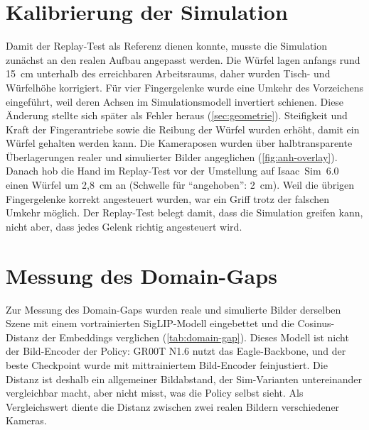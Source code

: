 \section{Kalibrierung der Simulation}
\label{sec:kalibrierung}

Damit der Replay-Test als Referenz dienen konnte, musste die Simulation
zunächst an den realen Aufbau angepasst werden. Die Würfel lagen anfangs rund
15~cm unterhalb des erreichbaren Arbeitsraums, daher wurden Tisch- und
Würfelhöhe korrigiert. Für vier Fingergelenke wurde eine Umkehr des
Vorzeichens eingeführt, weil deren Achsen im Simulationsmodell invertiert
schienen. Diese Änderung stellte sich später als Fehler heraus
(\cref{sec:geometrie}). Steifigkeit und Kraft der Fingerantriebe sowie die
Reibung der Würfel wurden erhöht, damit ein Würfel gehalten werden kann. Die
Kameraposen wurden über halbtransparente Überlagerungen realer und simulierter
Bilder angeglichen (\cref{fig:anh-overlay}). Danach hob die Hand im
Replay-Test vor der Umstellung auf Isaac~Sim~6.0 einen Würfel um 2,8~cm an (Schwelle für
\enquote{angehoben}: 2~cm). Weil die übrigen Fingergelenke korrekt angesteuert
wurden, war ein Griff trotz der falschen Umkehr möglich. Der Replay-Test
belegt damit, dass die Simulation greifen kann, nicht aber, dass jedes Gelenk
richtig angesteuert wird.

\section{Messung des Domain-Gaps}
\label{sec:domain-gap-ergebnis}
\label{sec:sim-fixes}
\label{sec:neukalibrierung}

Zur Messung des Domain-Gaps wurden reale und simulierte Bilder derselben
Szene mit einem vortrainierten SigLIP-Modell eingebettet und die
Cosinus-Distanz der Embeddings verglichen (\cref{tab:domain-gap}). Dieses
Modell ist nicht der Bild-Encoder der Policy: GR00T N1.6 nutzt das
Eagle-Backbone, und der beste Checkpoint wurde mit mittrainiertem Bild-Encoder
feinjustiert. Die Distanz ist deshalb ein allgemeiner Bildabstand, der
Sim-Varianten untereinander vergleichbar macht, aber nicht misst, was die
Policy selbst sieht. Als Vergleichswert diente die
Distanz zwischen zwei realen Bildern verschiedener Kameras.


